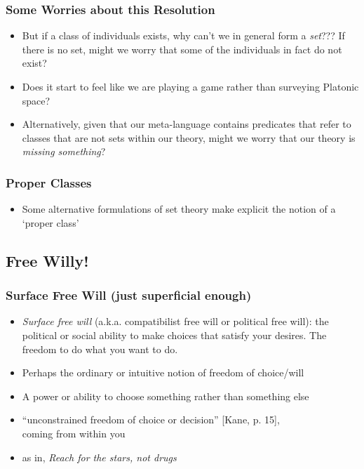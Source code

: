 \begin{frame}
\frametitle{Some Worries about this Resolution}

\begin{itemize}[<+->]

\item But if a class of individuals exists, why can't we in general form a \textit{set}??? If there is no set, might we worry that some of the individuals in fact do not exist?

\item Does it start to feel like we are playing a game rather than surveying Platonic space?

\item Alternatively, given that our meta-language contains predicates that refer to classes that are not sets within our theory, might we worry that our theory is \textit{missing something}?


\end{itemize}
\end{frame}

\begin{frame}
\frametitle{Proper Classes}

\begin{itemize}[<+->]

\item Some alternative formulations of set theory make explicit the notion of a `proper class'

\end{itemize}
\end{frame}






\subsection{Free Willy!}

\begin{frame}
\frametitle{Surface Free Will (just superficial enough)}

\begin{itemize}[<+->]

\item \emph{Surface free will} (a.k.a. compatibilist free will or political free will): the political or social ability to make choices that satisfy your desires. The freedom to do what you want to do.
\item Perhaps the ordinary or intuitive notion of freedom of choice/will
\item A power or ability to choose something rather than something else
\item ``unconstrained freedom of choice or decision'' [Kane, p. 15], \\ coming from within you

\item as in, \textit{Reach for the stars, not drugs} 

\end{itemize}
\end{frame}

